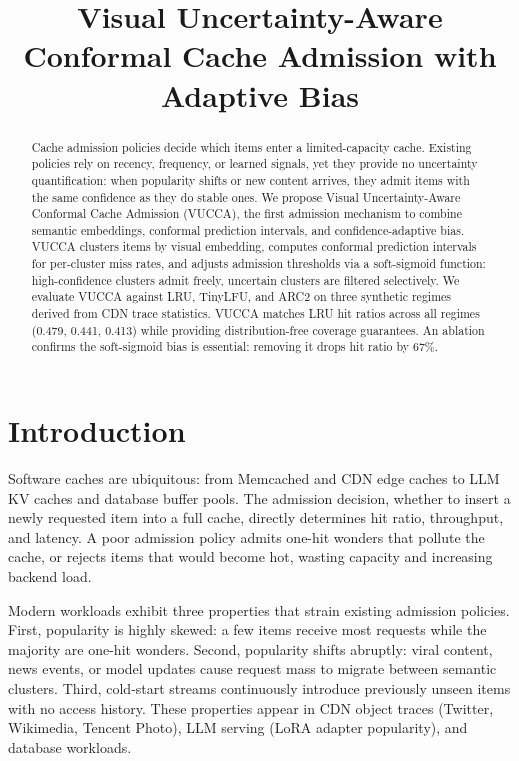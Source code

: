 \documentclass[11pt,letterpaper]{article}
\title{Visual Uncertainty-Aware Conformal Cache Admission with Adaptive Bias}
\author{}
\date{}
\begin{document}
\maketitle

\begin{abstract}
Cache admission policies decide which items enter a limited-capacity cache. Existing policies rely on recency, frequency, or learned signals, yet they provide no uncertainty quantification: when popularity shifts or new content arrives, they admit items with the same confidence as they do stable ones. We propose Visual Uncertainty-Aware Conformal Cache Admission (VUCCA), the first admission mechanism to combine semantic embeddings, conformal prediction intervals, and confidence-adaptive bias. VUCCA clusters items by visual embedding, computes conformal prediction intervals for per-cluster miss rates, and adjusts admission thresholds via a soft-sigmoid function: high-confidence clusters admit freely, uncertain clusters are filtered selectively. We evaluate VUCCA against LRU, TinyLFU, and ARC2 on three synthetic regimes derived from CDN trace statistics. VUCCA matches LRU hit ratios across all regimes (0.479, 0.441, 0.413) while providing distribution-free coverage guarantees. An ablation confirms the soft-sigmoid bias is essential: removing it drops hit ratio by 67\%.
\end{abstract}

\section{Introduction}

Software caches are ubiquitous: from Memcached and CDN edge caches to LLM KV caches and database buffer pools. The admission decision, whether to insert a newly requested item into a full cache, directly determines hit ratio, throughput, and latency. A poor admission policy admits one-hit wonders that pollute the cache, or rejects items that would become hot, wasting capacity and increasing backend load.

Modern workloads exhibit three properties that strain existing admission policies. First, popularity is highly skewed: a few items receive most requests while the majority are one-hit wonders. Second, popularity shifts abruptly: viral content, news events, or model updates cause request mass to migrate between semantic clusters. Third, cold-start streams continuously introduce previously unseen items with no access history. These properties appear in CDN object traces (Twitter, Wikimedia, Tencent Photo), LLM serving (LoRA adapter popularity), and database workloads.
\end{document}
